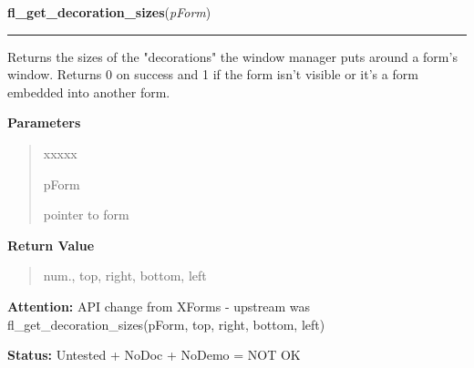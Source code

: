 \hspace{.8\funcindent}\begin{boxedminipage}{\funcwidth}

    \raggedright \textbf{fl\_get\_decoration\_sizes}(\textit{pForm})

    \vspace{-1.5ex}

    \rule{\textwidth}{0.5\fboxrule}
\setlength{\parskip}{2ex}
    Returns the sizes of the "decorations" the window manager puts around a
    form's window. Returns 0 on success and 1 if the form isn't visible or 
    it's a form embedded into another form.

\setlength{\parskip}{1ex}
      \textbf{Parameters}
      \vspace{-1ex}

      \begin{quote}
        \begin{Ventry}{xxxxx}

          \item[pForm]

          pointer to form

        \end{Ventry}

      \end{quote}

      \textbf{Return Value}
    \vspace{-1ex}

      \begin{quote}
      num., top, right, bottom, left

      \end{quote}

\textbf{Attention:} API change from XForms - upstream was fl\_get\_decoration\_sizes(pForm, 
top, right, bottom, left)



\textbf{Status:} Untested + NoDoc + NoDemo = NOT OK



    \end{boxedminipage}

    \label{xformslib:library:fl_raise_form}

    \vspace{0.5ex}

